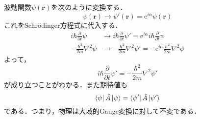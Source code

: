 \documentclass{standalone}
\begin{document}
  波動関数$\psi(\bm{r})$を次のように変換する．
  \begin{equation}
    \psi(\bm{r})\to\psi'(\bm{r})=\mathrm{e}^{i\alpha}\psi(\bm{r})
  \end{equation}
  これをSchrödinger方程式に代入する．
  \begin{align}
    i\hbar\frac{\partial}{\partial t}\psi&\to i\hbar\frac{\partial}{\partial t}\psi'=\mathrm{e}^{i\alpha}i\hbar\frac{\partial}{\partial t}\psi\\
    -\frac{\hbar^2}{2m}\nabla^2\psi&\to-\frac{\hbar^2}{2m}\nabla^2\psi'=-\mathrm{e}^{i\alpha}\frac{\hbar^2}{2m}\nabla^2\psi
  \end{align}
  よって，
  \begin{equation}
    i\hbar\frac{\partial}{\partial t}\psi'=-\frac{\hbar^2}{2m}\nabla^2\psi'
  \end{equation}
  が成り立つことがわかる．また期待値も
  \begin{equation}
    \bra{\psi}\hat{A}\ket{\psi}=\bra{\psi'}\hat{A}\ket{\psi'}
  \end{equation}
  である．つまり，物理は大域的Gauge変換に対して不変である．
\end{document}
